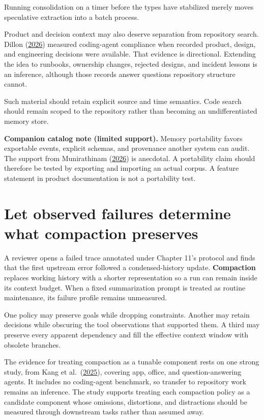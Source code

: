 Running consolidation on a timer before the types have stabilized merely moves speculative extraction into a batch process.

Product and decision context may also deserve separation from repository search. Dillon (\href{https://arxiv.org/abs/2605.08112}{2026}) measured coding-agent compliance when recorded product, design, and engineering decisions were available. That evidence is directional. Extending the idea to runbooks, ownership changes, rejected designs, and incident lessons is an inference, although those records answer questions repository structure cannot.

Such material should retain explicit source and time semantics. Code search should remain scoped to the repository rather than becoming an undifferentiated memory store.

\textbf{Companion catalog note (limited support).} Memory portability favors exportable events, explicit schemas, and provenance another system can audit. The support from Munirathinam (\href{https://arxiv.org/abs/2606.01138}{2026}) is anecdotal. A portability claim should therefore be tested by exporting and importing an actual corpus. A feature statement in product documentation is not a portability test.

\hypertarget{let-observed-failures-determine-what-compaction-preserves}{%
\section{Let observed failures determine what compaction preserves}\label{let-observed-failures-determine-what-compaction-preserves}}

A reviewer opens a failed trace annotated under Chapter 11's protocol and finds that the first upstream error followed a condensed-history update. \textbf{Compaction} replaces working history with a shorter representation so a run can remain inside its context budget. When a fixed summarization prompt is treated as routine maintenance, its failure profile remains unmeasured.

One policy may preserve goals while dropping constraints. Another may retain decisions while obscuring the tool observations that supported them. A third may preserve every apparent dependency and fill the effective context window with obsolete branches.

The evidence for treating compaction as a tunable component rests on one strong study, from Kang et al.~(\href{https://arxiv.org/abs/2510.00615}{2025}), covering app, office, and question-answering agents. It includes no coding-agent benchmark, so transfer to repository work remains an inference. The study supports treating each compaction policy as a candidate component whose omissions, distortions, and distractions should be measured through downstream tasks rather than assumed away.

